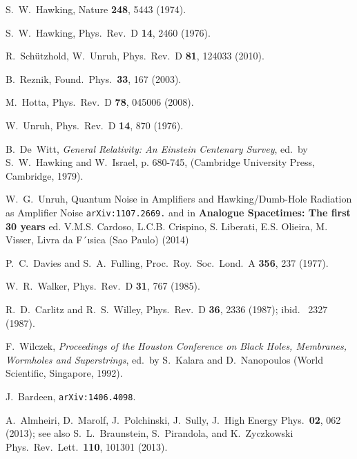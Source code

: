 \documentclass[aps,prd,showpacs,amssymb,nofootinbib,twocolumn]{revtex4}
\begin{document}
\begin{thebibliography}{000}

S.\  W.\ Hawking, Nature {\bf 248}, 5443 (1974). 

S.\ W.\ Hawking, Phys.\ Rev.\ D {\bf 14}, 2460 (1976).  

R.\ Sch\"utzhold, W.\ Unruh, Phys.\ Rev.\ D {\bf 81}, 124033 (2010). 

B.\ Reznik, Found.\ Phys.\ {\bf 33}, 167 (2003). 

M.\ Hotta, Phys.\ Rev.\ D {\bf 78}, 045006 (2008). 

W.\ Unruh, Phys.\ Rev.\ D {\bf 14}, 870 (1976). 

B.\ De~Witt, {\it General Relativity: An Einstein Centenary Survey}, 
ed.\ by S.\ W.\ Hawking and W.\ Israel, p. 680-745, 
(Cambridge University Press, Cambridge, 1979).

W.~G.~Unruh,
Quantum Noise in Amplifiers and Hawking/Dumb-Hole Radiation as Amplifier Noise
{\tt arXiv:1107.2669.} 
and in  {\bf Analogue Spacetimes: The first 30 years} ed.  V.M.S. Cardoso, L.C.B.
Crispino, S. Liberati, E.S. Olieira, M. Visser, Livra da F´ısica (Sao Paulo)
(2014)  

P.~C.~Davies and S.~A.~Fulling,
Proc.\ Roy.\ Soc.\ Lond.\ A {\bf 356}, 237 (1977).

W.~R.~Walker,
Phys.\ Rev.\ D {\bf 31}, 767 (1985).

R.\ D.\ Carlitz and R.\ S.\ Willey, 
Phys.\ Rev.\ D {\bf 36}, 2336 (1987);
%
ibid.\ %
2327 (1987). 

F.\ Wilczek, {\it Proceedings of the Houston Conference on Black Holes, 
Membranes, Wormholes and Superstrings}, ed.\ by S.\ Kalara and D.\ Nanopoulos 
(World Scientific, Singapore, 1992).

J.\ Bardeen, {\tt arXiv:1406.4098}. 

A.\ Almheiri, D.\ Marolf, J.\ Polchinski, J.\ Sully, 
J.\ High Energy Phys.\ {\bf 02}, 062 (2013); see also 
S.~L.~Braunstein, S.~Pirandola, and K.~Zyczkowski
Phys.\ Rev.\ Lett.\ {\bf 110}, 101301 (2013). 

\end{thebibliography}
\end{document}
